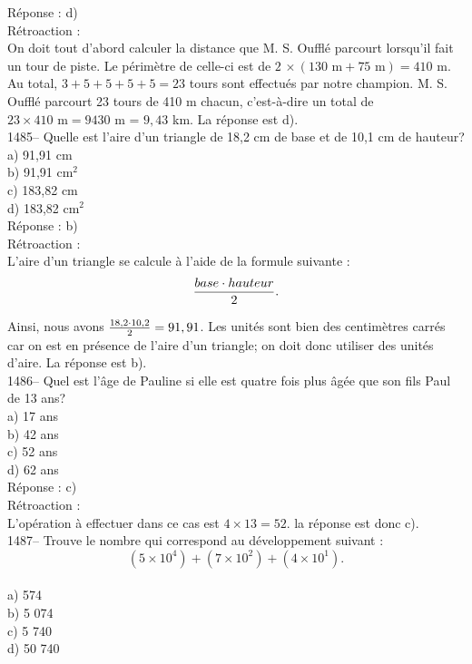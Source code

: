 R\'eponse : d)\\

R\'etroaction :\\
On doit tout d'abord calculer la distance que M. S. Ouffl\'e
parcourt lorsqu'il fait un tour de piste. Le p\'erim\`etre de
celle-ci est de $2\,\times(130{\textrm{ m}}+75{\textrm{ m}})=410$ m.
Au total, $3+5+5+5+5=23$ tours sont effectu\'es par notre champion.
M. S. Ouffl\'e parcourt 23 tours de 410 m chacun, c'est-\`a-dire
un total de $23\times410{\textrm{ m}}=9430$ m = $9,43$ km. La r\'eponse est
d).\\

1485-- Quelle est l'aire d'un triangle de 18,2 cm de base et de 10,1 cm de
hauteur?\\
a) 91,91 cm\\
b) 91,91 cm$^{2}$\\
c) 183,82 cm\\
d) 183,82 cm$^{2}$\\

R\'eponse : b)\\

R\'etroaction :\\
L'aire d'un triangle se calcule \`a l'aide de la formule suivante :
$${\LARGE \frac {base\cdot hauteur}{2}}.$$

Ainsi, nous avons ${\LARGE \frac {18,2\cdot 10,2}{2}}= 91,91$. Les
unit\'es sont bien des centim\`etres carr\'es car on est en
pr\'esence de l'aire d'un triangle; on doit donc
utiliser des unit\'es d'aire. La r\'eponse est b).\\

1486-- Quel est l'\^age de Pauline si elle est quatre fois plus
\^ag\'ee que
son fils Paul de 13 ans?\\
a) 17 ans\\
b) 42 ans\\
c) 52 ans\\
d) 62 ans\\

R\'eponse : c)\\

R\'etroaction :\\
L'op\'eration \`a effectuer dans ce cas est $4\times13=52$. la
r\'eponse
est donc c).\\

1487-- Trouve le nombre qui correspond au d\'eveloppement suivant :\\
$$(5\times10^4)+(7\times10^2)+(4\times10^1).$$\\
a) 574\\
b) 5 074\\
c) 5 740\\
d) 50 740\\

